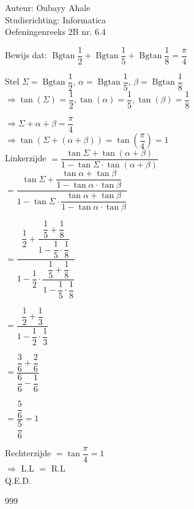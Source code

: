 \documentclass[a4paper]{article}
\begin{document}
  
\noindent \large Auteur: Oubayy Ahale          \\
\noindent \large Studierichting: Informatica   \\
\noindent \large Oefeningenreeks 2B nr. 6.4    \\

\medskip

\normalsize

Bewijs dat: $ \operatorname{Bgtan} \dfrac{1}{2} + \operatorname{Bgtan} \dfrac{1}{5} + \operatorname{Bgtan} \dfrac{1}{8} = \dfrac{\pi}{4} $\\

\medskip

Stel $ \Sigma = \operatorname{Bgtan} \dfrac{1}{2} $, $ \alpha = \operatorname{Bgtan} \dfrac{1}{5} $, $ \beta = \operatorname{Bgtan} \dfrac{1}{8} $\\

$ \Rightarrow \tan(\Sigma) = \dfrac{1}{2}, \tan(\alpha) = \dfrac{1}{5}, \tan(\beta) = \dfrac{1}{8} $\\

\medskip

$ \Rightarrow \Sigma + \alpha + \beta = \dfrac{\pi}{4} $\\

$ \Rightarrow \tan(\Sigma + (\alpha + \beta)) = \tan\left(\dfrac{\pi}{4}\right) = 1 $\\

Linkerzijde $ = \dfrac{\tan \Sigma + \tan (\alpha + \beta)}{1 - \tan \Sigma \cdot \tan (\alpha + \beta)} $\\

$ = \dfrac{\tan \Sigma + \dfrac{\tan \alpha + \tan \beta}{1 - \tan \alpha \cdot \tan \beta}}{1 - \tan \Sigma \cdot \dfrac{\tan \alpha + \tan \beta}{1 - \tan \alpha \cdot \tan \beta}} $\\

\medskip

$ = \dfrac{\dfrac{1}{2} + \dfrac{\dfrac{1}{5} + \dfrac{1}{8}}{1 - \dfrac{1}{5} \cdot \dfrac{1}{8}} }  {1 - \dfrac{1}{2} \cdot \dfrac{\dfrac{1}{5} + \dfrac{1}{8}}{1 - \dfrac{1}{5} \cdot \dfrac{1}{8}}} $\\

\medskip

$ = \dfrac{\dfrac{1}{2} + \dfrac{1}{3}}{1 - \dfrac{1}{2} \cdot \dfrac{1}{3}} $\\

\medskip

$ = \dfrac{\dfrac{3}{6} + \dfrac{2}{6}}{\dfrac{6}{6} - \dfrac{1}{6}} $\\

\medskip

$ = \dfrac{\dfrac{5}{6}}{\dfrac{5}{6}} = 1 $\\

\medskip

Rechterzijde $ = \tan \dfrac{\pi}{4} = 1 $\\

$ \Rightarrow $ L.L $=$ R.L \\

Q.E.D.

\begin{thebibliography}{999}
\end{thebibliography}
\end{document}
